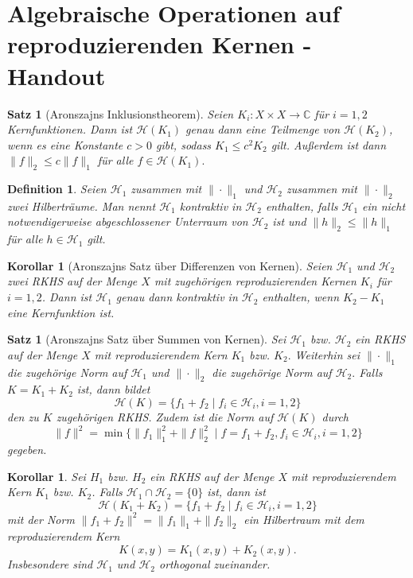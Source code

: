 \documentclass[12pt,titlepage,twoside,cleardoublepage]{article}
\theoremstyle{nummermitklammern}
\newtheorem{korollar}[temp]{Korollar}
\newtheorem{definition}[temp]{Definition}
\newtheorem{satz}[temp]{Satz}
\newtheorem{definition}[zahl]{Definition}
\newtheorem{satz}[zahl]{Satz}
\numberwithin{equation}{section}
\newtheorem{korollar}[zahl]{Korollar}
\begin{document}
\setcounter{section}{4}
\section{Algebraische Operationen auf reproduzierenden Kernen - Handout}
\begin{satz}[Aronszajns Inklusionstheorem]\label{51}
Seien $K_i:X\times X\to \mathbb{C}$ für $i=1,2$ Kernfunktionen. Dann ist $\mathcal{H}(K_1)$ genau dann eine Teilmenge von $\mathcal{H}(K_2)$, wenn  es eine Konstante $c>0 $ gibt, sodass $K_1 \leq c^2 K_2$ gilt. 
Außerdem ist dann $\|f \|_2 \leq c\|f\|_1$ für alle $f\in \mathcal{H}(K_1).$ 
\end{satz}

\begin{definition}
Seien $\mathcal{H}_1$ zusammen mit $\|\cdot\|_1$ und $\mathcal{H}_2$ zusammen mit $\| \cdot\|_2$ zwei Hilberträume. Man nennt $\mathcal{H}_1$ \emph{kontraktiv} in $\mathcal{H}_2$  enthalten, falls $\mathcal{H}_1$ ein nicht notwendigerweise abgeschlossener Unterraum von $\mathcal{H}_2$ ist und $\|h\|_2 \leq \|h\|_1$ für alle $h \in \mathcal{H}_1$ gilt.
\end{definition}

\begin{korollar}[Aronszajns Satz über Differenzen von Kernen] 
Seien $\mathcal{H}_1$ und $\mathcal{H}_2$ zwei RKHS auf der Menge $X$ mit zugehörigen reproduzierenden Kernen $K_i$ für $i=1,2$. Dann ist $\mathcal{H}_1$ genau dann kontraktiv in $\mathcal{H}_2$ enthalten, wenn $K_2-K_1$ eine Kernfunktion ist.
\end{korollar}

\begin{satz}[Aronszajns Satz über Summen von Kernen]
Sei $\mathcal{H}_1$ bzw. $\mathcal{H}_2$ ein RKHS auf der Menge $X$ mit reproduzierendem Kern $K_1$ bzw. $K_2.$ Weiterhin sei $\|\cdot\|_1$ die zugehörige Norm auf $\mathcal{H}_1$ und $\|\cdot\|_2$ die zugehörige Norm auf $\mathcal{H}_2.$ Falls $K=K_1+K_2$ ist, dann bildet 
 \[
\mathcal{H}(K)=\{f_1+f_2\mid f_i\in \mathcal{H}_i,i=1,2\} 
 \] 
 den zu $K$ zugehörigen RKHS. Zudem ist die Norm auf $\mathcal{H}(K)$ durch 
 \[
\|f\|^2=\min\{\|f_1\|_1^2+\|f\|_2^2\mid f=f_1+f_2,f_i\in \mathcal{H}_i,i=1,2\} 
 \]
 gegeben.
\end{satz}
\begin{korollar}
Sei $H_1$ bzw. $H_2$ ein RKHS auf der Menge $X$ mit reproduzierendem Kern $K_1$ bzw. $K_2$. Falls $\mathcal{H}_1 \cap \mathcal{H}_2=\{0\}$ ist, dann ist 
\[
\mathcal{H}(K_1+K_2)=\{f_1+f_2\mid f_i\in \mathcal{H}_i,i=1,2\}
\] 
mit der Norm $\|f_1+f_2\|^2=\|f_1\|_1+\|f_2\|_2$
ein Hilbertraum mit dem reproduzierendem Kern
\[
K(x,y)=K_1(x,y)+K_2(x,y).
\]
Insbesondere sind $\mathcal{H}_1$ und $\mathcal{H}_2$ orthogonal zueinander.
\end{korollar}
\end{document}
